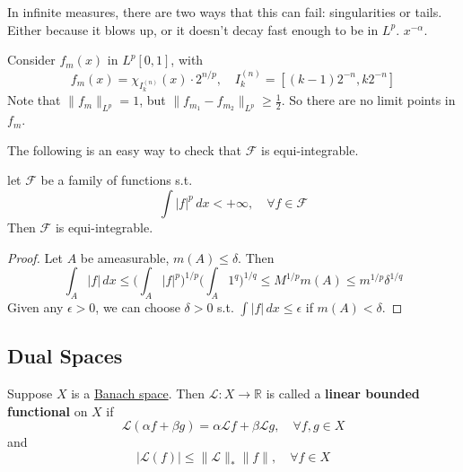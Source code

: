   In infinite measures, there are two ways that this can fail: singularities or tails. Either because it blows up, or it doesn't decay fast enough to be in $L^p$. $x^{-\alpha}$. 

  \begin{example}
    \label{ex:a-sequence-with-no-lp-limit-point}
    Consider $f_m (x)$ in $L^p [0, 1]$, with 
    \begin{equation}
      f_m (x) =  \chi_{I_k^{(n)}} (x) \cdot 2^{n/p}, \quad I_k^{(n)} = [ (k-1) 2^{-n}, k 2^{-n}] 
    \end{equation}
    Note that $\|f_m\|_{L^p} = 1$, but $\|f_{m_1} - f_{m_2}\|_{L^p} \geq \frac{1}{2}$. So there are no limit points in $f_m$. 
  \end{example}


  The following is an easy way to check that $\mathscr{F}$ is equi-integrable. 

  \begin{corollary}
    \label{thm:equi-integrability-of-a-bounded-family}
    let $\mathscr{F}$ be a family of functions s.t. 
    \begin{equation}
      \int |f|^p \,dx < +\infty, \quad \forall f \in \mathscr{F}
    \end{equation}
    Then $\mathscr{F}$ is equi-integrable. 
  \end{corollary}
  \begin{proof}
    Let $A$ be ameasurable, $m(A) \leq \delta$. Then 
    \begin{equation}
      \int_A |f| \,dx \leq \bigg( \int_A |f|^p \bigg)^{1/p} \bigg( \int_A 1^q \bigg)^{1/q} \leq M^{1/p} m(A) \leq m^{1/p} \delta^{1/q} 
    \end{equation}
    Given any $\epsilon > 0$, we can choose $\delta > 0$ s.t. $\int |f| \,dx \leq \epsilon$ if $m(A) < \delta$. 
  \end{proof}

\subsection{Dual Spaces}

  \begin{definition}
    \label{def:dual-vector}
    Suppose $X$ is a \hyperref[mv-def:banach-space]{Banach space}. Then $\mathcal{L}: X \to \mathbb{R}$ is called a \textbf{linear bounded functional} on $X$ if 
    \begin{equation}
      \mathcal{L}(\alpha f + \beta g)  = \alpha \mathcal{L} f + \beta \mathcal{L} g, \quad \forall f, g \in X
    \end{equation}
    and  
    \begin{equation}
      | \mathcal{L} (f)| \leq \|\mathcal{L}\|_\ast \|f\|, \quad \forall f \in X
    \end{equation}
  \end{definition}

